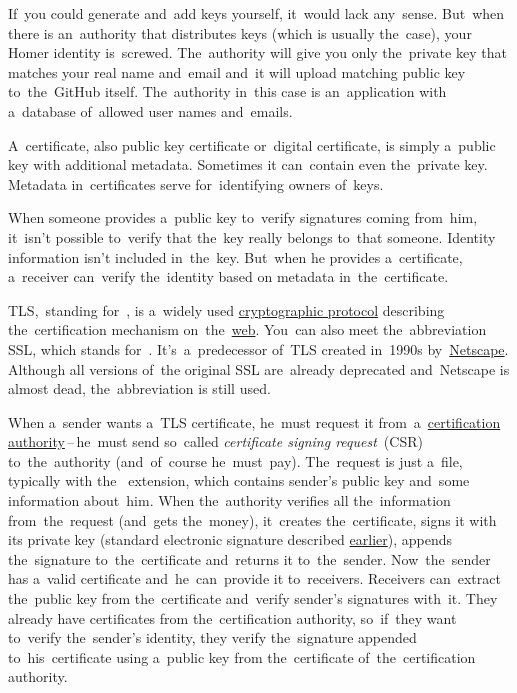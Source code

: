 If~you could generate and~add keys yourself, it~would lack any~sense.
But~when there is an~authority that distributes keys (which is usually the~case), your Homer identity is~screwed.
The~authority will give you only the~private key that matches your real name and~email and~it will upload matching public key to~the~GitHub itself.
The~authority in~this case is an~application with a~database of~allowed user names and~emails.

\label{certificate}
A~certificate, also public key certificate or~digital certificate, is simply a~public key with additional metadata.
Sometimes it can~contain even the~private key.
Metadata in~certificates serve for~identifying owners of~keys.

When someone provides a~public key to~verify signatures coming from~him, it~isn't possible to~verify that the~key really belongs to~that someone.
Identity information isn't included in~the~key.
But~when he provides a~certificate, a~receiver can~verify the~identity based on metadata in~the~certificate.

\label{tls}
TLS,~standing for~, is a~widely used \hyperref[protocolstandard]{cryptographic protocol} describing the~certification mechanism on~the~\hyperref[internetweb]{web}.
You~can also meet the~abbreviation SSL, which stands for~.
It's~a~predecessor of~TLS created in~1990s by~\href{https://en.wikipedia.org/wiki/Netscape}{Netscape}.
Although all versions of~the original SSL are~already deprecated and~Netscape is almost dead, the~abbreviation is still used.

When a~sender wants a~TLS certificate, he~must request it from~a~\hyperref[certificationauthority]{certification authority}\,--\,he~must send so~called \textit{certificate signing request}~(CSR) to~the~authority (and~of~course he~must~pay).
The~request is just a~file, typically with the~ extension, which contains sender's public key and~some information about~him.
When the~authority verifies all the~information from~the~request (and~gets the~money), it~creates the~certificate, signs it with its private key (standard electronic signature described \hyperref[electronicsignature]{earlier}), appends the~signature to~the~certificate and~returns it to~the~sender.
Now~the~sender has a~valid certificate and~he~can~provide it to~receivers.
Receivers can~extract the~public key from the~certificate and~verify sender's signatures with~it.
They already have certificates from the~certification authority, so~if~they want to~verify the~sender's identity, they verify the~signature appended to~his~certificate using a~public key from the~certificate of~the~certification authority.


